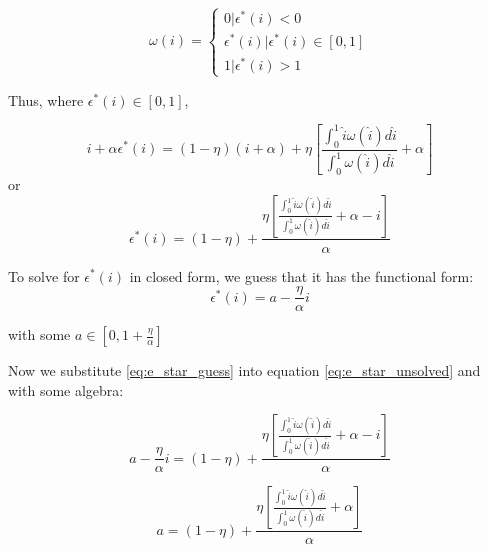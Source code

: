 \documentclass[WP]{AEA}
\begin{document}
\begin{equation} \label{eq:omega_epsilon}
\omega(i) =
	\begin{cases}
		0 |  \epsilon^* (i) < 0 \\
		\epsilon^* (i) | \epsilon^* (i) \in [0,1] \\
		1 |  \epsilon^* (i) > 1
	\end{cases}
\end{equation}



Thus, where $ \epsilon^* (i) \in [0,1]$,

\begin{equation}
 i+\alpha \epsilon^*(i) = (1-\eta)(i+\alpha ) + \eta  \left[ \frac{\int_0^1 \hat{i} \omega(\hat{i}) d\hat{i}}{\int_0^1  \omega(\hat{i}) d\hat{i}} + \alpha \right] 
\end{equation}
or
\begin{equation} \label{eq:e_star_unsolved}
 \epsilon^*(i) = (1-\eta) + \frac{   \eta \left[ \frac{\int_0^1 \hat{i} \omega(\hat{i}) d\hat{i}}{\int_0^1  \omega(\hat{i}) d\hat{i}} + \alpha -i \right] }{\alpha} 
\end{equation}

To solve for $  \epsilon^*(i)$ in closed form, we guess that it has the functional form:
 \begin{equation} \label{eq:e_star_guess}
 \epsilon^*(i) = a-\frac{\eta }{\alpha}i
 \end{equation}
 
 with some  $a \in [0,1+\frac{\eta }{\alpha}]$

Now we substitute \ref{eq:e_star_guess} into equation \ref{eq:e_star_unsolved} and with some algebra:

$$a-\frac{\eta }{\alpha}i= (1-\eta) + \frac{   \eta \left[ \frac{\int_0^1 \hat{i} \omega(\hat{i}) d\hat{i}}{\int_0^1  \omega(\hat{i}) d\hat{i}} + \alpha -i \right] }{\alpha } $$

$$
a= (1-\eta) + \frac{   \eta\left[ \frac{\int_0^1 \hat{i} \omega(\hat{i}) d\hat{i}}{\int_0^1  \omega(\hat{i}) d\hat{i}} + \alpha  \right] }{\alpha} 
$$
\end{document}

